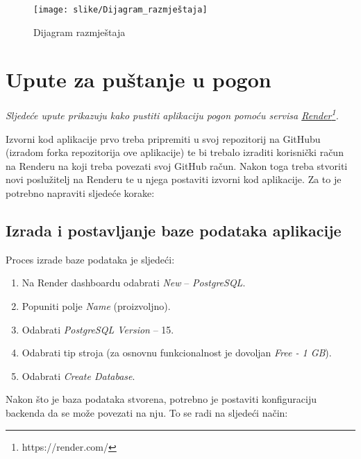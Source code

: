 \begin{figure}[!htb]
	\centering
	\texttt{[image: slike/Dijagram\_razmještaja]}
	\caption{Dijagram razmještaja}
\end{figure}

\eject

\section{Upute za puštanje u pogon}

\textit{Sljedeće upute prikazuju kako pustiti aplikaciju pogon pomoću servisa \underline{Render}\footnote{https://render.com/}.}

Izvorni kod aplikacije prvo treba pripremiti u svoj repozitorij na GitHubu (izradom forka repozitorija ove aplikacije) te bi trebalo izraditi korisnički račun na Renderu na koji treba povezati svoj GitHub račun. Nakon toga treba stvoriti novi poslužitelj na Renderu te u njega postaviti izvorni kod aplikacije. Za to je potrebno napraviti sljedeće korake:

\subsection{Izrada i postavljanje baze podataka aplikacije}

Proces izrade baze podataka je sljedeći:

\begin{enumerate}
	\item Na Render dashboardu odabrati \textit{New} -- \textit{PostgreSQL}.
	\item Popuniti polje \textit{Name} (proizvoljno).
	\item Odabrati \textit{PostgreSQL Version} -- 15.
	\item Odabrati tip stroja (za osnovnu funkcionalnost je dovoljan \textit{Free - 1 GB}).
	\item Odabrati \textit{Create Database}.
\end{enumerate}

Nakon što je baza podataka stvorena, potrebno je postaviti konfiguraciju backenda da se može povezati na nju. To se radi na sljedeći način:

